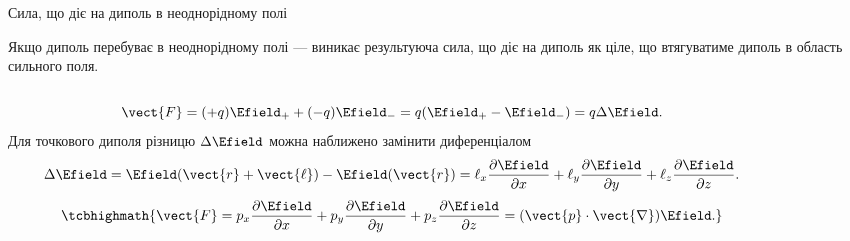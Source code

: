 \documentclass{beamer}
\begin{document}
\begin{frame}{Сила, що діє на диполь в неоднорідному полі}{}
	\begin{block}{}\justifying
		Якщо \alert{диполь перебуває в неоднорідному полі} --- виникає \alert{результуюча сила}, що діє
		на диполь як  ціле, що \alert{втягуватиме диполь в область сильного поля}.
	\end{block}
	\begin{columns}
		\begin{column}{0.6\linewidth}
			\begin{block}{}\justifying
				\begin{equation*}
					\vect{F} = (+q)\Efield_+ + (-q)\Efield_- = q(\Efield_+ - \Efield_-) =
					q\Delta\Efield.
				\end{equation*}
				Для точкового диполя різницю $\Delta\Efield$ можна наближено замінити диференціалом
				\begin{equation*}
					\Delta\Efield = \Efield(\vect{r} + \vect{\ell}) - \Efield(\vect{r})= \ell_x
					\frac{\partial\Efield}{\partial x} +
					\ell_y \frac{\partial\Efield}{\partial y} + \ell_z
					\frac{\partial\Efield}{\partial z}.
				\end{equation*}
				\begin{equation*}\tcbhighmath{
						\vect{F} = p_x \frac{\partial\Efield}{\partial x} +
						p_y \frac{\partial\Efield}{\partial y} + p_z \frac{\partial\Efield}{\partial z}
						=
						(\vect{p}\cdot\vect{\nabla})\Efield.
					}
				\end{equation*}
			\end{block}
		\end{column}
		\begin{column}{0.4\linewidth}\centering
			
		\end{column}
	\end{columns}
\end{frame}
\end{document}
